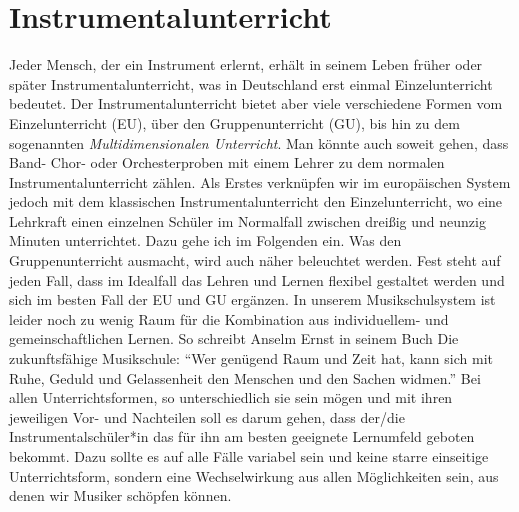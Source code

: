 \section{Instrumentalunterricht}

Jeder Mensch, der ein Instrument erlernt, erhält in seinem Leben früher oder
später Instrumentalunterricht, was in Deutschland erst einmal Einzelunterricht
bedeutet. Der Instrumentalunterricht bietet aber viele verschiedene Formen vom
Einzelunterricht (EU), über den Gruppenunterricht (GU), bis hin zu dem
sogenannten \emph{Multidimensionalen Unterricht}. Man könnte auch soweit gehen,
dass Band- Chor- oder Orchesterproben mit einem Lehrer zu dem normalen
Instrumentalunterricht zählen. Als Erstes verknüpfen wir im europäischen System
jedoch mit dem klassischen Instrumentalunterricht den Einzelunterricht, wo eine
Lehrkraft einen einzelnen Schüler im Normalfall zwischen dreißig und neunzig
Minuten unterrichtet. Dazu gehe ich im Folgenden ein. Was den
Gruppenunterricht ausmacht, wird auch näher beleuchtet werden. Fest steht auf
jeden Fall, dass im Idealfall das Lehren und Lernen flexibel gestaltet werden
und sich im besten Fall der EU und GU ergänzen. In unserem Musikschulsystem ist
leider noch zu wenig Raum für die Kombination aus individuellem- und
gemeinschaftlichen Lernen. So schreibt Anselm Ernst in seinem Buch Die
zukunftsfähige Musikschule: \enquote{Wer genügend Raum und Zeit hat, kann sich mit Ruhe,
Geduld und Gelassenheit den Menschen und den Sachen widmen.}
\autocite[84]{ernst:die_zukunftsfaehige_musikschule} Bei allen
Unterrichtsformen, so unterschiedlich sie sein mögen und mit ihren jeweiligen
Vor- und Nachteilen soll es darum gehen, dass der/die Instrumentalschüler*in das für
ihn am besten geeignete Lernumfeld geboten bekommt. Dazu sollte es auf alle
Fälle variabel sein und keine starre einseitige Unterrichtsform, sondern eine
Wechselwirkung aus allen Möglichkeiten sein, aus denen wir Musiker schöpfen
können. 


